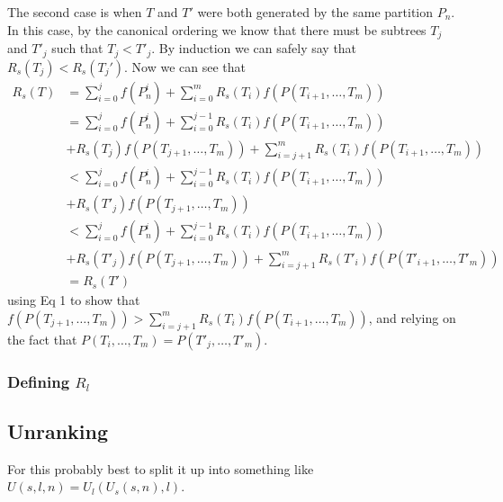 \documentclass{article}
\begin{document}
The second case is when $T$ and $T'$ were both generated by the same
partition $P_n$. In this case, by the canonical ordering we know that
there must be subtrees $T_j$ and $T'_j$ such that $T_j < T'_j$. By
induction we can safely say that $R_s(T_j) < R_s(T_j')$. Now we can see
that
\begin{align*}
    R_s(T)
    &= \sum_{i=0}^{j} f(P_n^i) + \sum_{i=0}^m R_s(T_i)f(P(T_{i+1}, \ldots, T_m))\\
    &= \sum_{i=0}^{j} f(P_n^i) + \sum_{i=0}^{j-1} R_s(T_i)f(P(T_{i+1}, \ldots, T_m))\\
    &+ R_s(T_j)f(P(T_{j+1}, \ldots, T_m)) + \sum_{i=j+1}^m R_s(T_i)f(P(T_{i+1}, \ldots, T_m))\\
    &< \sum_{i=0}^{j} f(P_n^i) + \sum_{i=0}^{j-1} R_s(T_i)f(P(T_{i+1}, \ldots, T_m))\\
    &+ R_s(T'_j)f(P(T_{j+1}, \ldots, T_m))\\
    &< \sum_{i=0}^{j} f(P_n^i) + \sum_{i=0}^{j-1} R_s(T_i)f(P(T_{i+1}, \ldots, T_m))\\
    &+ R_s(T'_j)f(P(T_{j+1}, \ldots, T_m)) + \sum_{i=j+1}^m R_s(T'_i)f(P(T'_{i+1}, \ldots, T'_m))\\
    &= R_s(T')
\end{align*}
using Eq 1 to show that
$f(P(T_{j+1}, \ldots, T_m)) > \sum_{i=j+1}^m R_s(T_i)f(P(T_{i+1}, \ldots, T_m))$, and
relying on the fact that $P(T_i, \ldots, T_m) = P(T'_j, \ldots, T'_m)$.

\subsubsection{Defining $R_l$}

\subsection{Unranking}
For this probably best to split it up into something like
$U(s, l, n) = U_l(U_s(s, n), l)$.
\end{document}
